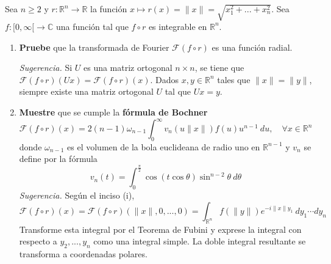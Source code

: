 \documentclass[12pt]{report}
\newcounter{it}
\theoremstyle{largebreak}
\renewcommand{\geq}{\ensuremath{\geqslant}}
\newcommand\cf[3]{\ensuremath{#1:#2\rightarrow#3}}
\newcommand\norm[1]{\ensuremath{\|#1\|}}
\newcommand{\fou}[1]{\ensuremath{\mathcal{F}#1}}
\begin{document}
    \begin{excer}
        Sea $n\geq2$ y $\cf{r}{\mathbb{R}^n}{\mathbb{R}}$ la función $x\mapsto r(x)=\norm{x}=\sqrt{x_1^2+...+x_n^2}$. Sea $\cf{f}{[0,\infty[}{\mathbb{C}}$ una función tal que $f\circ r$ es integrable en $\mathbb{R}^n$.
        \begin{enumerate}
            \item \textbf{Pruebe} que la transformada de Fourier $\fou{(f\circ r)}$ es una función radial.
            
            \textit{Sugerencia.} Si $U$ es una matriz ortogonal $n\times n$, se tiene que $\fou{(f\circ r)}(Ux)=\fou{(f\circ r)}(x)$. Dados $x,y\in\mathbb{R}^n$ tales que $\norm{x}=\norm{y}$, siempre existe una matriz ortogonal $U$ tal que $Ux=y$.

            \item \textbf{Muestre} que se cumple la \textbf{fórmula de Bochner}
            \begin{equation*}
                \fou{(f\circ r)}(x)=2(n-1)\omega_{ n-1}\int_0^\infty v_n(u\norm{x})f(u)u^{ n-1}\:du,\quad\forall x\in\mathbb{R}^n
            \end{equation*}
            donde $\omega_{n-1}$ es el volumen de la bola euclideana de radio uno en $\mathbb{R}^{ n-1}$ y $v_n$ se define por la fórmula
            \begin{equation*}
                v_n(t)=\int_0^{\frac{\pi}{2}}\cos(t\cos\theta)\sin^{ n-2}\theta\:d\theta
            \end{equation*}
            \textit{Sugerencia.} Según el inciso (i),
            \begin{equation*}
                \fou{(f\circ r)}(x)=\fou{(f\circ r)}(\norm{x},0,...,0)=\int_{\mathbb{R}^n}f(\norm{y})e^{ -i\norm{x}y_1}\:dy_1\cdots dy_n
            \end{equation*}
            Transforme esta integral por el Teorema de Fubini y exprese la integral con respecto a $y_2,...,y_n$ como una integral simple. La doble integral resultante se transforma a coordenadas polares.
        \end{enumerate}
    \end{excer}
\end{document}
